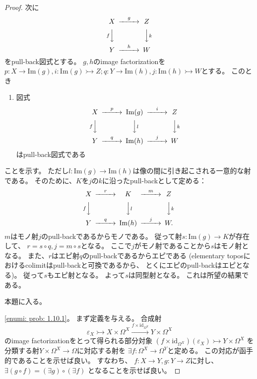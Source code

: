 \documentclass[uplatex]{jsarticle}
\theoremstyle{definition}
\def\ep{\varepsilon}
\def\id{\mathrm{id}}
\newcommand{\rtot}{\rightarrowtail}
\newcommand{\im}{\mathrm{Im}}
\begin{document}
\begin{proof}
  次に
  \[
  \begin{CD}
    X @> g >> Z \\
    @V f VV @VV k V \\
    Y @> h >> W
  \end{CD}
  \]
  をpull-back図式とする。
  \(g,h\)のimage factorizationを
  \(p:X\to \im(g), i:\im(g) \rtot Z;
  q:Y\to \im(h), j:\im(h) \rtot W\)とする。
  このとき
  \begin{enumerate}[label=(\fnsymbol*),start=4]
    \item \label{enumi: prob: 1.10 proof 3}
    図式
    \[
    \begin{CD}
      X @> p >> \im(g) @> i >> Z \\
      @V f VV @VV l V @VV k V \\
      Y @> q >> \im(h) @> j >> W
    \end{CD}
    \]
    はpull-back図式である
  \end{enumerate}
  ことを示す。
  ただし\(l:\im(g) \to \im(h)\)は像の間に引き起こされる一意的な射である。
  そのために、\(K\)を\(j\)の\(k\)に沿ったpull-backとして定める：
  \[
  \begin{CD}
    X @> r >> K @> m >> Z \\
    @V f VV @VV l V @VV k V \\
    Y @> q >> \im(h) @> j >> W.
  \end{CD}
  \]
  \(m\)はモノ射\(j\)のpull-backであるからモノである。
  従って射\(s:\im(g) \to K\)が存在して、
  \(r = s\circ q, j = m\circ s\)となる。
  ここで\(j\)がモノ射であることから\(s\)はモノ射となる。
  また、\(r\)はエピ射\(q\)のpull-backであるからエピである
  (elementary toposにおけるcolimitはpull-backと可換であるから、
  とくにエピのpull-backはエピとなる)。
  従って\(s\)もエピ射となる。
  よって\(s\)は同型射となる。
  これは所望の結果である。

  本題に入る。

  \ref{enumi: prob: 1.10.1}。
  まず定義を与える。
  合成射
  \[
  \ep_X \rtot X\times \Omega^X \xrightarrow{f\times \id_{\Omega^X}} Y\times \Omega^X
  \]
  のimage factorizationをとって得られる部分対象
  \((f\times \id_{\Omega^X})(\ep_X)\rtot Y\times \Omega^X\)
  を分類する射\(Y\times \Omega^X\to \Omega\)に対応する射を
  \(\exists f:\Omega^X \to \Omega^Y\)と定める。
  この対応が函手的であることを示せば良い。
  すなわち、
  \(f:X\to Y, g:Y\to Z\)に対し、
  \(\exists (g\circ f) = (\exists g)\circ (\exists f)\)
  となることを示せば良い。


\end{proof}
\end{document}
